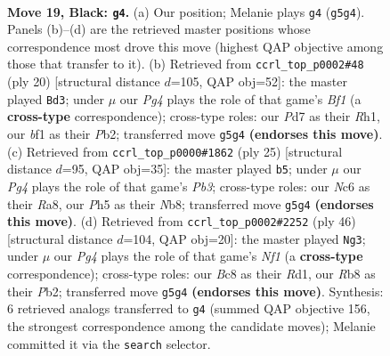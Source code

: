 \documentclass[11pt]{article}
\begin{document}
\clearpage

\begin{figure}[p]\centering
\begin{subfigure}{0.46\textwidth}\centering
\resizebox{\linewidth}{!}{%
\newchessgame
\chessboard[
  setfen={1rb2r2/p1ppqp2/2n1p2k/2n3pp/2Q5/2B2NP1/PP2PP1P/2R1KB1R b - - 1 19},
  showmover=false,
  pgfstyle=straightmove, color=movearrow, markmove={g5-g4}
]}
\caption{}
\end{subfigure}\hfill
\begin{subfigure}{0.46\textwidth}\centering
\resizebox{\linewidth}{!}{%
\newchessgame
\chessboard[
  setfen={r1b1kb1r/pp3pp1/2n1p2p/8/3PNq2/P4N2/1P3PPP/R2QKB1R w KQkq - 1 11},
  showmover=false,
  pgfstyle=straightmove, color=movearrow, markmove={f1-d3}
]}
\caption{}
\end{subfigure}
\\[4pt]
\begin{subfigure}{0.46\textwidth}\centering
\resizebox{\linewidth}{!}{%
\newchessgame
\chessboard[
  setfen={rn1q1rk1/2p1bppp/pp2p3/3n4/2QP4/P1N2PP1/1P1BBP1P/R3K2R b KQ - 4 13},
  showmover=false,
  pgfstyle=straightmove, color=movearrow, markmove={b6-b5}
]}
\caption{}
\end{subfigure}\hfill
\begin{subfigure}{0.46\textwidth}\centering
\resizebox{\linewidth}{!}{%
\newchessgame
\chessboard[
  setfen={1rb2rk1/2p2ppp/p1P1q1n1/3R4/1p1BPb2/1P3N2/1PQ3PP/3R1NK1 w - - 6 24},
  showmover=false,
  pgfstyle=straightmove, color=movearrow, markmove={f1-g3}
]}
\caption{}
\end{subfigure}
\caption{\textbf{Move 19, Black: \texttt{g4}.} (a) Our position; Melanie plays \texttt{g4} (\texttt{g5g4}). Panels (b)--(d) are the retrieved master positions whose correspondence most drove this move (highest QAP objective among those that transfer to it). (b) Retrieved from \texttt{ccrl\_top\_p0002\#48} (ply 20) [structural distance $d$=105, QAP obj=52]: the master played \texttt{Bd3}; under $\mu$ our \emph{Pg4} plays the role of that game's \emph{Bf1} (a \textbf{cross-type} correspondence); cross-type roles: our \emph{P}d7 as their \emph{R}h1, our \emph{b}f1 as their \emph{P}b2; transferred move \texttt{g5g4} \textbf{(endorses this move)}. (c) Retrieved from \texttt{ccrl\_top\_p0000\#1862} (ply 25) [structural distance $d$=95, QAP obj=35]: the master played \texttt{b5}; under $\mu$ our \emph{Pg4} plays the role of that game's \emph{Pb3}; cross-type roles: our \emph{N}c6 as their \emph{R}a8, our \emph{P}h5 as their \emph{N}b8; transferred move \texttt{g5g4} \textbf{(endorses this move)}. (d) Retrieved from \texttt{ccrl\_top\_p0002\#2252} (ply 46) [structural distance $d$=104, QAP obj=20]: the master played \texttt{Ng3}; under $\mu$ our \emph{Pg4} plays the role of that game's \emph{Nf1} (a \textbf{cross-type} correspondence); cross-type roles: our \emph{B}c8 as their \emph{R}d1, our \emph{R}b8 as their \emph{P}b2; transferred move \texttt{g5g4} \textbf{(endorses this move)}. Synthesis: 6 retrieved analogs transferred to \texttt{g4} (summed QAP objective 156, the strongest correspondence among the candidate moves); Melanie committed it via the \texttt{search} selector.}
\label{fig:thought-m37}
\end{figure}
\end{document}
